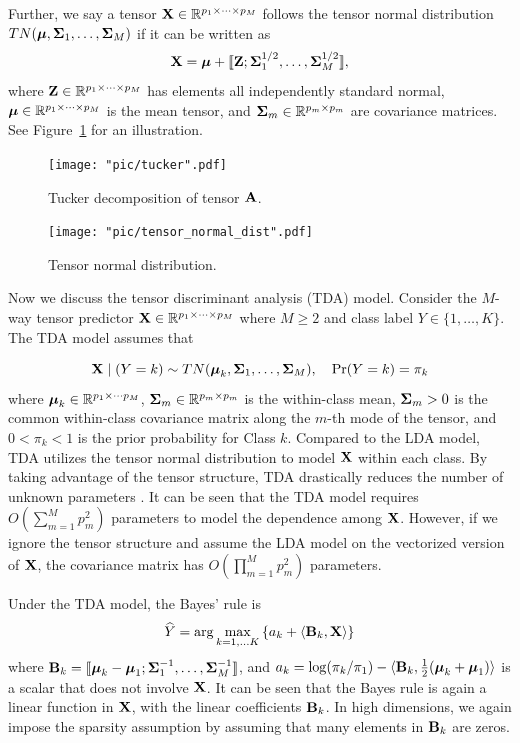 Further, we say a tensor $\mathbf{X}\in \mathbb{R}^{p_{1}\times\cdots\times p_{M}}$ follows the tensor normal distribution $TN(\boldsymbol{\mu},\boldsymbol{\Sigma}_1,\ldots,\boldsymbol{\Sigma}_M)$ if it can be written as 
$$
\mathbf{X}=\boldsymbol{\mu}+\llbracket\mathbf{Z};\boldsymbol{\Sigma}_1^{1/2},\ldots,\boldsymbol{\Sigma}_M^{1/2}\rrbracket,
$$ 
where $\mathbf{Z}\in \mathbb{R}^{p_{1}\times\cdots\times p_{M}}$ has elements all independently standard normal, $\boldsymbol{\mu}\in \mathbb{R}^{p_{1}\times\cdots\times p_{M}}$ is the mean tensor, and $\boldsymbol{\Sigma}_m\in\mathbb{R}^{p_m\times p_m}$ are covariance matrices. See Figure~\ref{fig:tn} for an illustration.

\begin{figure}[H]
 \begin{minipage}{.5\textwidth}
  \centering
  \texttt{[image: "pic/tucker".pdf]}
  \caption{Tucker decomposition of tensor $\mathbf{A}$.}
  \label{fig:tucker}
 \end{minipage}
 \begin{minipage}{.5\textwidth}
  \centering
  \texttt{[image: "pic/tensor\_normal\_dist".pdf]}
  \caption{Tensor normal distribution.}
  \label{fig:tn}
 \end{minipage}
\end{figure} 



Now we discuss the tensor discriminant analysis (TDA) model. Consider the $M$-way tensor predictor $\mathbf{X}\in\mathbb{R}^{p_1\times\cdots\times p_M}$ where $M\geq 2$ and class label $Y\in \{1,\ldots,K\}$. The TDA model assumes that


\begin{equation}\label{tda}
\mathbf{X}\mid(Y=k)\sim TN(\boldsymbol{\mu}_k,\boldsymbol{\Sigma}_1,\ldots,\boldsymbol{\Sigma}_M), \quad\Pr(Y=k)=\pi_k
\end{equation}
where $\boldsymbol{\mu}_k\in\mathbb{R}^{p_1\times \cdots p_M}$, $\boldsymbol{\Sigma}_{m}\in\mathbb{R}^{p_m\times p_m}$ is the within-class mean, $\boldsymbol{\Sigma}_m>0$ is the common within-class covariance matrix along the $m$-th mode of the tensor, and $0<\pi_k<1$ is the prior probability for Class $k$. Compared to the LDA model, TDA utilizes the tensor normal distribution to model $\mathbf{X}$ within each class. By taking advantage of the tensor structure, TDA drastically reduces the number of unknown parameters \citep{catch}. It can be seen that the TDA model requires $O(\sum_{m=1}^M p_m^2)$ parameters to model the dependence among $\mathbf{X}$. However, if we ignore the tensor structure and assume the LDA model on the vectorized version of $\mathbf{X}$, the covariance matrix has $O(\prod_{m=1}^Mp_m^2)$ parameters.


Under the TDA model, the Bayes' rule is
\begin{equation}\label{bayestda}
\widehat{Y}=\arg\max_{k=1,\dots K}\left\{ a_k+\langle\mathbf{B}_{k},\mathbf{X}\rangle\right\}
\end{equation}
where $\mathbf{B}_k=\llbracket \boldsymbol{\mu}_k-\boldsymbol{\mu}_1; \boldsymbol{\Sigma}_1^{-1},\ldots,\boldsymbol{\Sigma}_M^{-1}\rrbracket$,  and $a_k=\log({\pi_k}/{\pi_1})-\langle \mathbf{B}_k,\frac{1}{2}(\boldsymbol{\mu}_k+\boldsymbol{\mu}_1)\rangle$ is a scalar that does not involve $\mathbf{X}$. It can be seen that the Bayes rule is again a linear function in $\mathbf{X}$, with the linear coefficients $\mathbf{B}_k$. In high dimensions, we again impose the sparsity assumption by assuming that many elements in $\mathbf{B}_k$ are zeros.


